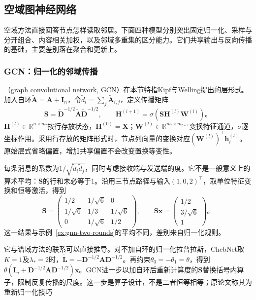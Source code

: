 \subsection{空域图神经网络}
\label{sec:gnn-spatial}

空域方法直接回答节点怎样读取邻居。下面四种模型分别突出固定归一化、采样与分开组合、内容相关加权，以及邻域多重集的区分能力。它们共享输出与反向传播的基础，主要差别落在聚合和更新上。

\subsubsection{GCN：归一化的邻域传播}
\label{sec:gnn-gcn}

（graph convolutional network, GCN）在本节特指Kipf与Welling提出的层形式。加入自环$\widetilde{\bm{A}}=\bm{A}+\bm{I}_n$，令$\widetilde d_i=\sum_j\widetilde{\bm{A}}_{i,j}$，定义传播矩阵
\begin{equation}
  \bm{S}=\widetilde{\bm{D}}^{-1/2}\widetilde{\bm{A}}\widetilde{\bm{D}}^{-1/2},
  \qquad
  \bm{H}^{(l+1)}=\sigma\!\left(\bm{S}\bm{H}^{(l)}\bm{W}^{(l)}\right)\text{。}
  \label{eq:gnn-gcn-layer}
\end{equation}
$\bm{H}^{(l)}\in\mathbb{R}^{n\times m_l}$按行存放状态，$\bm{H}^{(0)}=\bm{X}$；$\bm{W}^{(l)}\in\mathbb{R}^{m_l\times m_{l+1}}$变换特征通道，$\sigma$逐坐标作用。采用行存放的矩阵形式时，节点列向量的变换对应$(\bm{W}^{(l)})^{\top}\bm{h}_i^{(l)}$。原始层式省略偏置，增加共享偏置不会改变置换等变性。

每条消息的系数为$1/\sqrt{\widetilde d_i\widetilde d_j}$，同时考虑接收端与发送端的度。它不是一般意义上的算术平均：$\bm{S}$的行和未必等于1。沿用三节点路径与输入$(1,0,2)^{\top}$，取单位特征变换和恒等激活，得到
\begin{equation}
  \bm{S}=\begin{pmatrix}
    1/2&1/\sqrt6&0\\
    1/\sqrt6&1/3&1/\sqrt6\\
    0&1/\sqrt6&1/2
  \end{pmatrix},\qquad
  \bm{S}\bm{x}=\begin{pmatrix}1/2\\3/\sqrt6\\1\end{pmatrix}\text{。}
  \label{eq:gnn-gcn-example}
\end{equation}
这一结果与示例~\ref{ex:gnn-two-rounds}的平均不同，差别来自归一化规则。

它与谱域方法的联系可以直接推导。对不加自环的归一化拉普拉斯，ChebNet取$K=1$及$\lambda_*=2$时，$\widetilde{\bm{L}}=-\bm{D}^{-1/2}\bm{A}\bm{D}^{-1/2}$。再约束$\theta_0=-\theta_1=\theta$，得到$\theta(\bm{I}_n+\bm{D}^{-1/2}\bm{A}\bm{D}^{-1/2})\bm{x}$。GCN进一步以加自环后重新计算度的$\bm{S}$替换括号内算子，限制反复传播的尺度。这一步是算子设计，不是二者恒等相等；原论文称其为重新归一化技巧

